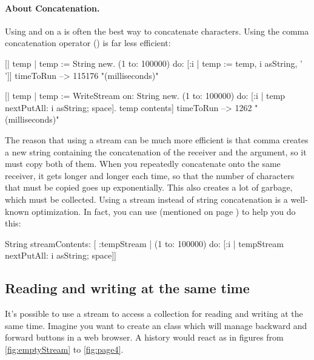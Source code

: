 \documentclass[a4paper,10pt,twoside]{book}
\begin{document}
\paragraph{About Concatenation.}
Using  and  on a  is often the best way to
concatenate characters. Using the comma concatenation operator (\ct{,}) is far
less efficient:

\begin{code}{}
[| temp |
  temp := String new.
  (1 to: 100000)
    do: [:i | temp := temp, i asString, ' ']] timeToRun --> 115176 "(milliseconds)"

[| temp |
  temp := WriteStream on: String new.
  (1 to: 100000)
    do: [:i | temp nextPutAll: i asString; space].
  temp contents] timeToRun --> 1262 "(milliseconds)"
\end{code}

The reason that using a stream can be much more efficient is that 
comma creates a new string containing
the concatenation of the receiver and the argument, so it must copy both of them.
When you repeatedly concatenate onto the same receiver, it gets longer and longer each time,
so that the number of characters that must be copied goes up exponentially.
This also creates a lot of garbage, which must be collected. Using
a stream instead of string concatenation is a well-known optimization.
In fact, you can use  (mentioned on page \pageref{sec:streamContents}) to help you do this:

\begin{code}{}
String streamContents: [ :tempStream |
  (1 to: 100000)
       do: [:i | tempStream nextPutAll: i asString; space]] 
\end{code}

\subsection{Reading and writing at the same time}

It's possible to use a stream to access a collection for reading and
writing at the same time.
Imagine you want to create an  class which will manage
backward and forward buttons in a web browser.
A history would react as in figures from \ref{fig:emptyStream} to
\ref{fig:page4}.
\end{document}
